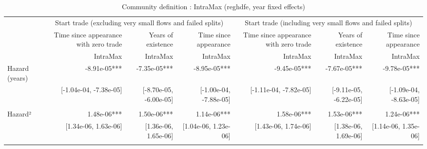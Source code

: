 \begin{table}[!h]
\caption{Community definition : IntraMax (reghdfe, year fixed effects)}
\centering
\begin{tabular}{lllllll}
\cline{1-7}
\multicolumn{1}{c}{} &
  \multicolumn{3}{|c}{Start trade (excluding very small flows and failed splits)} &
  \multicolumn{3}{c}{Start trade (including very small flows and failed splits)} \\
\multicolumn{1}{c}{} &
  \multicolumn{1}{|r}{Time since appearance with zero trade} &
  \multicolumn{1}{r}{Years of existence} &
  \multicolumn{1}{r}{Time since appearance} &
  \multicolumn{1}{r}{Time since appearance with zero trade} &
  \multicolumn{1}{r}{Years of existence} &
  \multicolumn{1}{r}{Time since appearance} \\
\multicolumn{1}{c}{} &
  \multicolumn{1}{|r}{IntraMax} &
  \multicolumn{1}{r}{IntraMax} &
  \multicolumn{1}{r}{IntraMax} &
  \multicolumn{1}{r}{IntraMax} &
  \multicolumn{1}{r}{IntraMax} &
  \multicolumn{1}{r}{IntraMax} \\
\cline{1-7}
\multicolumn{1}{l}{Hazard (years)} &
  \multicolumn{1}{|r}{-8.91e-05***} &
  \multicolumn{1}{r}{-7.35e-05***} &
  \multicolumn{1}{r}{-8.95e-05***} &
  \multicolumn{1}{r}{-9.45e-05***} &
  \multicolumn{1}{r}{-7.67e-05***} &
  \multicolumn{1}{r}{-9.78e-05***} \\
\multicolumn{1}{l}{} &
  \multicolumn{1}{|r}{[-1.04e-04, -7.38e-05]} &
  \multicolumn{1}{r}{[-8.70e-05, -6.00e-05]} &
  \multicolumn{1}{r}{[-1.00e-04, -7.88e-05]} &
  \multicolumn{1}{r}{[-1.11e-04, -7.82e-05]} &
  \multicolumn{1}{r}{[-9.11e-05, -6.22e-05]} &
  \multicolumn{1}{r}{[-1.09e-04, -8.63e-05]} \\
\multicolumn{1}{l}{} &
  \multicolumn{1}{|r}{} &
  \multicolumn{1}{r}{} &
  \multicolumn{1}{r}{} &
  \multicolumn{1}{r}{} &
  \multicolumn{1}{r}{} &
  \multicolumn{1}{r}{} \\
\multicolumn{1}{l}{Hazard²} &
  \multicolumn{1}{|r}{1.48e-06***} &
  \multicolumn{1}{r}{1.50e-06***} &
  \multicolumn{1}{r}{1.14e-06***} &
  \multicolumn{1}{r}{1.58e-06***} &
  \multicolumn{1}{r}{1.53e-06***} &
  \multicolumn{1}{r}{1.24e-06***} \\
\multicolumn{1}{l}{} &
  \multicolumn{1}{|r}{[1.34e-06,  1.63e-06]} &
  \multicolumn{1}{r}{[1.36e-06,  1.65e-06]} &
  \multicolumn{1}{r}{[1.04e-06,  1.23e-06]} &
  \multicolumn{1}{r}{[1.43e-06,  1.74e-06]} &
  \multicolumn{1}{r}{[1.38e-06,  1.69e-06]} &
  \multicolumn{1}{r}{[1.14e-06,  1.35e-06]} \\
\multicolumn{1}{l}{} &

\end{tabular}
\end{table}
